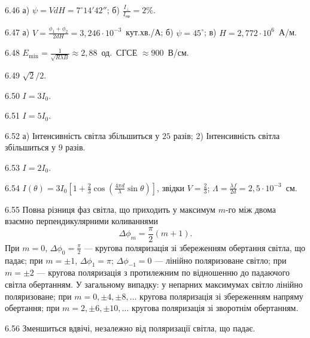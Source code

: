 \begin{Solution}{6.{46}}
        а) $ \psi = VdH = 7^\circ14'42'' $; б) $ \frac{I_\perp}{I_\text{пр}} = 2\% $.
    
\end{Solution}
\begin{Solution}{6.{47}}
        а) $ V = \frac{\phi_1 + \phi_2}{2dH} = 3,246 \cdot 10^{-3}$~кут.хв./А; б) $ \psi = 45^\circ $; в) $ H = 2,772\cdot10^6 $~А/м.
    
\end{Solution}
\begin{Solution}{6.{48}}
        $ E_{\min} = \frac{1}{\sqrt{R\lambda B}} \approx 2,88 $~од.~СГСЕ $ \approx 900 $~В/см.
    
\end{Solution}
\begin{Solution}{6.{49}}
        $ \sqrt{2}/2 $.
    
\end{Solution}
\begin{Solution}{6.{50}}
        $ I = 3I_0 $.
    
\end{Solution}
\begin{Solution}{6.{51}}
        $ I = 5I_0 $.
    
\end{Solution}
\begin{Solution}{6.{52}}
        а) Інтенсивність світла збільшиться у $ 25 $ разів; 2) Інтенсивність світла збільшиться у $ 9 $ разів.
    
\end{Solution}
\begin{Solution}{6.{53}}
        $ I = 2I_0 $.
    
\end{Solution}
\begin{Solution}{6.{54}}
        $ I(\theta) = 3I_0 \left[1 + \frac{2}{3} \cos \left(\frac{4\pi d}{\lambda} \sin\theta\right)\right]  $, звідки $ V = \frac{2}{3} $; $ \Lambda = \frac{\lambda f}{2 d} = 2,5 \cdot 10^{-3} $~см.
    
\end{Solution}
\begin{Solution}{6.{55}}
        Повна різниця фаз світла, що приходить у максимум $ m $-го між двома взаємно
        перпендикулярними коливаннями
        \begin{equation*}
            \Delta \phi_m = \frac{\pi}{2}(m + 1) .
        \end{equation*}
        При $ m = 0 $, $\Delta \phi_0 = \frac{\pi}{2} $ --- кругова поляризація зі збереженням обертання світла, що падає; при $ m = \pm1 $, $\Delta \phi_1 = \pi $; $ \Delta \phi_{-1} = 0 $ ---  лінійно поляризоване світло; при $  m = \pm2 $ --- кругова поляризація з протилежним по відношенню до падаючого світла обертанням. У загальному випадку: у непарних максимумах світло лінійно поляризоване; при $  m = 0, \pm4, \pm8, \ldots $ кругова поляризація зі збереженням напряму обертання; при $ m = 2, \pm6, \pm10, \ldots $ кругова поляризація зі зворотнім обертанням.
    
\end{Solution}
\begin{Solution}{6.{56}}
        Зменшиться вдвічі, незалежно від поляризації світла, що падає.
    
\end{Solution}
